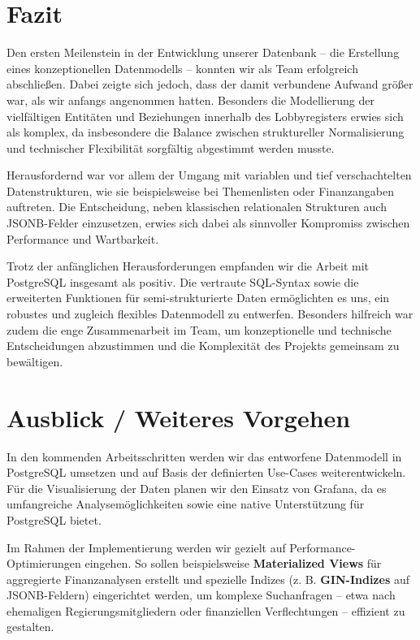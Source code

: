 \documentclass[12pt,twoside=false,a4paper,parskip]{scrbook}
\begin{document}
\chapter{Fazit}

Den ersten Meilenstein in der Entwicklung unserer Datenbank – die Erstellung eines konzeptionellen Datenmodells – konnten wir als Team erfolgreich abschließen. Dabei zeigte sich jedoch, dass der damit verbundene Aufwand größer war, als wir anfangs angenommen hatten. Besonders die Modellierung der vielfältigen Entitäten und Beziehungen innerhalb des Lobbyregisters erwies sich als komplex, da insbesondere die Balance zwischen struktureller Normalisierung und technischer Flexibilität sorgfältig abgestimmt werden musste.

Herausfordernd war vor allem der Umgang mit variablen und tief verschachtelten Datenstrukturen, wie sie beispielsweise bei Themenlisten oder Finanzangaben auftreten. Die Entscheidung, neben klassischen relationalen Strukturen auch JSONB-Felder einzusetzen, erwies sich dabei als sinnvoller Kompromiss zwischen Performance und Wartbarkeit.

Trotz der anfänglichen Herausforderungen empfanden wir die Arbeit mit PostgreSQL insgesamt als positiv. Die vertraute SQL-Syntax sowie die erweiterten Funktionen für semi-strukturierte Daten ermöglichten es uns, ein robustes und zugleich flexibles Datenmodell zu entwerfen. Besonders hilfreich war zudem die enge Zusammenarbeit im Team, um konzeptionelle und technische Entscheidungen abzustimmen und die Komplexität des Projekts gemeinsam zu bewältigen.

\chapter{Ausblick / Weiteres Vorgehen}

In den kommenden Arbeitsschritten werden wir das entworfene Datenmodell in PostgreSQL umsetzen und auf Basis der definierten Use-Cases weiterentwickeln. Für die Visualisierung der Daten planen wir den Einsatz von Grafana, da es umfangreiche Analysemöglichkeiten sowie eine native Unterstützung für PostgreSQL bietet.

Im Rahmen der Implementierung werden wir gezielt auf Performance-Optimierungen eingehen. So sollen beispielsweise \textbf{Materialized Views} für aggregierte Finanzanalysen erstellt und spezielle Indizes (z. B. \textbf{GIN-Indizes} auf JSONB-Feldern) eingerichtet werden, um komplexe Suchanfragen – etwa nach ehemaligen Regierungsmitgliedern oder finanziellen Verflechtungen – effizient zu gestalten.
\end{document}
